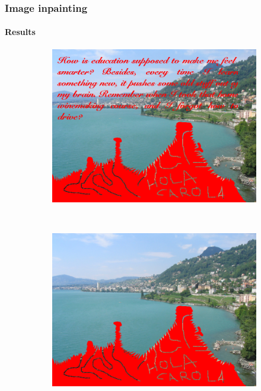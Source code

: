 \documentclass[11pt]{beamer}
\begin{document}
\begin{frame}
\frametitle{Image inpainting}
\framesubtitle{Results}
\begin{figure}
    \centering
    \begin{subfigure}[b]{0.47\textwidth}
        \includegraphics[width=\textwidth]{Image_to_Restore}

    \end{subfigure}
    ~ 
        \begin{subfigure}[b]{0.47\textwidth}
        \includegraphics[width=\textwidth]{Goal_inpaint}

    \end{subfigure}

\end{figure}
\end{frame}
\end{document}
